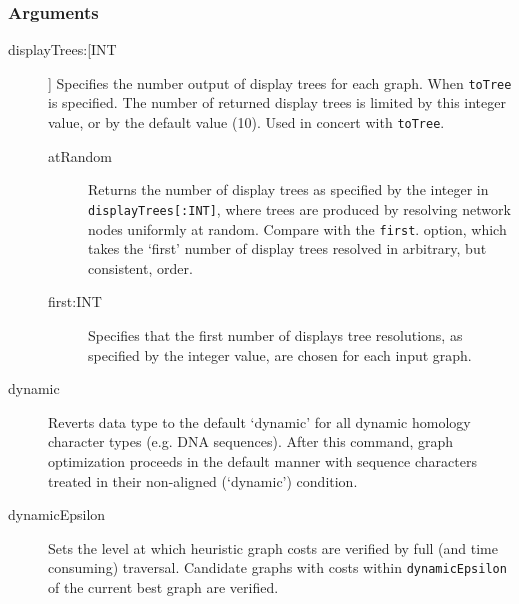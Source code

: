 	\subsubsection{Arguments}
	\begin{description}
			
			
		\item[displayTrees:[INT]] Specifies the number output of display trees for each graph. 
		When \texttt{toTree} is specified. 
		The number of returned display trees is limited by this
		integer value, or by the default value (10). Used in concert with \texttt{toTree}.
		
			\begin{description}
			\item[atRandom] Returns the number of display trees as specified by the integer in 
			\texttt{displayTrees[:INT]}, where trees are produced by resolving network nodes 
			uniformly at random. Compare with the \texttt{first}. option, which takes the `first' 
			number of display trees resolved in arbitrary, but consistent, order.

			\item[first:INT] Specifies that the first number of displays tree resolutions, as 
			specified by the integer value, are chosen for each input graph. 
			\end{description}
			
		\item[dynamic] Reverts data type to the default `dynamic' for all dynamic homology 
		\citep{Wheeler2001} character types (e.g. DNA sequences). After this command, 
		graph optimization proceeds in the default manner with sequence characters treated 
		in their non-aligned (`dynamic') condition.
			
		\item[dynamicEpsilon] Sets the level at which heuristic graph costs are verified by full 
		(and time consuming) traversal. Candidate graphs with costs within \texttt{dynamicEpsilon}
		 of the current best graph are verified.
			

\end{description}

